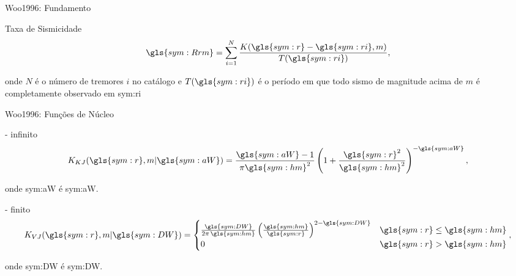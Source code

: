 \documentclass[ucs,8pt]{beamer}
\begin{document}
\subsection{\citet{woo_1996}}


\begin{frame}{Woo1996: Fundamento}
	\begin{block}{Taxa de Sismicidade}
		\begin{equation}
			\ensuremath{
				\gls{sym:Rrm} = \sum_{i=1}^{N} \frac{ K(\gls{sym:r} - \gls{sym:ri}, m)}
													{T({\gls{sym:ri})}},
			}
			\label{eq:Rrm}
		\end{equation}
	\end{block}
	onde $N$ é o número de tremores $i$ no catálogo 
	e $T(\gls{sym:ri})$ é o período em que todo sismo de magnitude acima de $m$ é completamente observado 
	em \gls{sym:ri}
\end{frame}


\begin{frame}{Woo1996: Funções de Núcleo}
	\begin{block}{\citet{kagan_knopoff_1980} - infinito}
		\begin{equation}
			\ensuremath{
				K_{KJ}(\gls{sym:r}, m \arrowvert \gls{sym:aW}) =  \frac{  \gls{sym:aW}  -1}{\pi\gls{sym:hm}^2}
									\left( 1 + \frac{\gls{sym:r}^2}{\gls{sym:hm}^2} \right)^{-\gls{sym:aW}},
			}
			\label{eq:k_kj}
		\end{equation}
	\end{block}
	onde \gls{sym:aW} é \glsdesc{sym:aW}.

	\begin{block}{\citet{verejones_1992} - finito}
		\begin{equation}
			\ensuremath{
				K_{VJ}(\gls{sym:r}, m \arrowvert \gls{sym:DW}) = 
				\begin{cases}
					\frac{\gls{sym:DW}}{2\pi\,\gls{sym:hm}} 
					\left( \frac{\gls{sym:hm}}{\gls{sym:r}} \right)^{2 - \gls{sym:DW}} 
					  & \gls{sym:r} \leq \gls{sym:hm} \\
					0 & \gls{sym:r} > \gls{sym:hm}
				\end{cases},
			}
			\label{eq:k_vj}
		\end{equation}
	\end{block}
	onde \gls{sym:DW} é \glsdesc{sym:DW}.
\end{frame}
\end{document}
